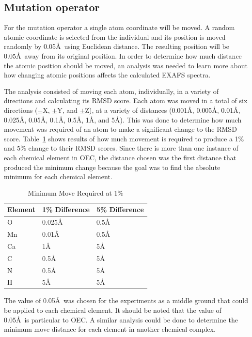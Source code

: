 \documentclass[conference]{IEEEtran}
\begin{document}
\subsection{Mutation operator}
\label{subsec:mutation}

For the mutation operator a single atom coordinate will be moved. A random atomic coordinate is selected from the individual and its position is moved randomly by 0.05\AA\  using Euclidean distance. The resulting position will be 0.05\AA\ away from its original position. In order to determine how much distance the atomic position should be moved, an analysis was needed to learn more about how changing atomic positions affects the calculated EXAFS spectra.

The analysis consisted of moving each atom, individually, in a variety of directions and calculating its RMSD score. Each atom was moved in a total of six directions ($\pm$X, $\pm$Y, and $\pm$Z), at a variety of distances (0.001\AA, 0.005\AA, 0.01\AA, 0.025\AA, 0.05\AA, 0.1\AA, 0.5\AA, 1\AA, and 5\AA). This was done to determine how much movement was required of an atom to make a significant change to the RMSD score. Table~\ref{table:minMove} shows results of how much movement is required to produce a 1\% and 5\% change to their RMSD scores. Since there is more than one instance of each chemical element in OEC, the distance chosen was the first distance that produced the minimum change because the goal was to find the absolute minimum for each chemical element.

\begin{table}
\caption{Minimum Move Required at 1\%}
\label{table:minMove}
\centering
\normalsize
\begin{tabular}{ | l | l | l | }
  \hline
    Element & 1\% Difference & 5\% Difference \\ \hline
    O & 0.025\AA & 0.5\AA \\ \hline
    Mn & 0.01\AA & 0.5\AA \\ \hline
    Ca & 1\AA & 5\AA \\ \hline
    C & 0.5\AA & 5\AA \\ \hline
    N & 0.5\AA & 5\AA \\ \hline
    H & 5\AA & 5\AA \\ \hline
\end{tabular}
\end{table}

The value of 0.05\AA\ was chosen for the experiments as a middle ground that could be applied to each chemical element. It should be noted that the value of 0.05\AA\ is particular to OEC. A similar analysis could be done to determine the minimum move distance for each element in another chemical complex.
\end{document}
